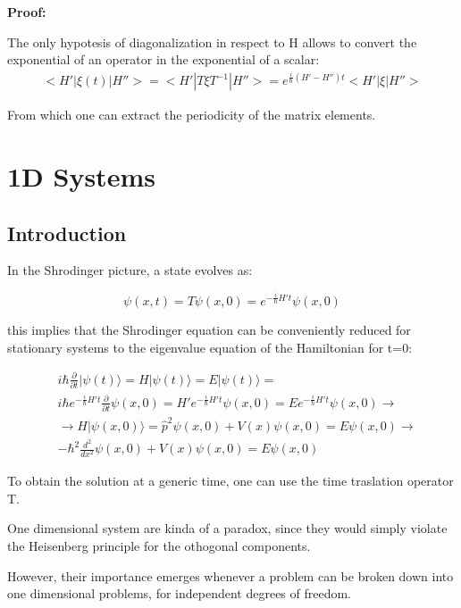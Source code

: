 \documentclass{report}
\begin{document}
\textbf{Proof:}

The only hypotesis of diagonalization in respect to H allows to convert the exponential of an operator in the exponential of a scalar:
\begin{align*}
  <H'|\xi(t)|H''>=<H'|T \xi T^{-1} |H''>=e^{\frac{i}{\hbar}(H'-H'')t}<H'|\xi|H''>
\end{align*}

From which one can extract the periodicity of the matrix elements.

\chapter{1D Systems}

\section{Introduction}
In the Shrodinger picture, a state evolves as:

\begin{equation}
  \psi(x,t)=T\psi(x,0)=e^{-\frac{i}{\hbar}H't}\psi(x,0)
\end{equation}

this implies that the Shrodinger equation can be conveniently reduced for stationary systems to the eigenvalue equation of the Hamiltonian for t=0:

\begin{align*}
   & i\hbar \frac{\partial}{\partial t}  |\psi(t)\rangle = H|\psi(t)\rangle= E|\psi(t)\rangle =                                                           \\
   & i\hbar e^{-\frac{i}{\hbar}H't}\frac{\partial}{\partial t} \psi(x,0)=H'e^{-\frac{i}{\hbar}H't}\psi(x,0)=Ee^{-\frac{i}{\hbar}H't}\psi(x,0) \rightarrow \\
   & \rightarrow H |\psi(x, 0)\rangle = \hat{p}^2\psi(x,0)+V(x)\psi(x,0)=E\psi(x,0) \rightarrow                                                           \\
   & -\hbar^2\frac{d^2}{dx^2}\psi(x,0)+V(x)\psi(x,0)=E\psi(x,0)
\end{align*}

To obtain the solution at a generic time, one can use the time traslation operator T.

One dimensional system are kinda of a paradox, since they would simply violate the Heisenberg principle for
the othogonal components.

However, their importance emerges whenever a problem can be broken down into
one dimensional problems, for independent degrees of freedom.
\end{document}
